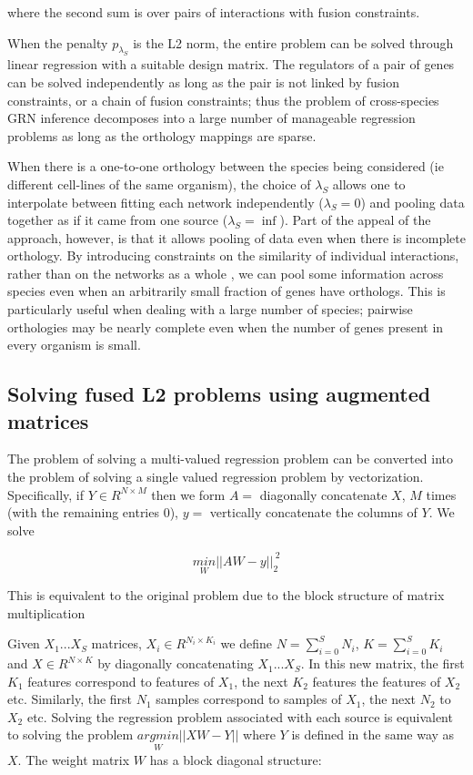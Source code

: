 \documentclass[11pt]{article}
\begin{document}
where the second sum is over pairs of interactions with fusion constraints. 

When the penalty $p_{\lambda_S}$ is the L2 norm, the entire problem can be solved through linear regression with a suitable design matrix. The regulators of a pair of genes can be solved independently as long as the pair is not linked by fusion constraints, or a chain of fusion constraints; thus the problem of cross-species GRN inference decomposes into a large number of manageable regression problems as long as the orthology mappings are sparse.


When there is a one-to-one orthology between the species being considered (ie different cell-lines of the same organism), the choice of $\lambda_S$ allows one to interpolate between fitting each network independently ($\lambda_S=0$) and pooling data together as if it came from one source ($\lambda_S=\inf$). Part of the appeal of the approach, however, is that it allows pooling of data even when there is incomplete orthology. By introducing constraints on the similarity of individual interactions, rather than on the networks as a whole \cite{liu2011temporal}, we can pool some information across species even when an arbitrarily small fraction of genes have orthologs. This is particularly useful when dealing with a large number of species; pairwise orthologies may be nearly complete even when the number of genes present in every organism is small. 

\subsection{Solving fused L2 problems using augmented matrices}
The problem of solving a multi-valued regression problem can be converted into the problem of solving a single valued regression problem by vectorization.
Specifically, if $Y \in R^{N \times M}$ then we form $A =$ diagonally concatenate $X$, $M$ times (with the remaining entries 0),
$y =$ vertically concatenate the columns of $Y$. We solve 

$$\underset{W}{min} ||AW - y||_2^{~2}$$

This is equivalent to the original problem due to the block structure of matrix multiplication

Given $X_1... X_S$ matrices, $X_i \in R^{N_i \times K_i}$ we define $N = \sum_{i=0}^S N_i$, $K = \sum_{i=0}^SK_i$ and $X \in R^{N \times K}$ by diagonally concatenating $X_1...X_S$.
In this new matrix, the first $K_1$ features correspond to features of $X_1$, the next $K_2$ features the features of $X_2$ etc.
Similarly, the first $N_1$ samples correspond to samples of $X_1$, the next $N_2$ to $X_2$ etc.
Solving the regression problem associated with each source is equivalent to solving the problem $\underset{W}{argmin}||XW-Y||$ where $Y$ is defined in the same way as $X$.
The weight matrix $W$ has a block diagonal structure:
\end{document}
